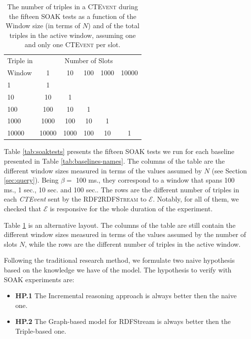 \begin{table}[htb]
	\centering
	\begin{tabular}{l | ccccc} %
	  	\hline
		Triple in & \multicolumn{5}{c}{Number of Slots}  \\
		Window  & 1 & 10 & 100 & 1000&10000\\
		\hline
		1  	 & 1\\
		10   & 10  & 1 \\
		100  & 100 & 10 & 1\\
		1000 & 1000& 100& 10& 1\\
		10000& 10000 & 1000& 100& 10& 1\\
		\hline %
	 \end{tabular}
	\caption{The number of triples in a \textsc{CTEvent} during the fifteen SOAK tests as a function of the Window size (in terms of $N$) and of the total triples in the active window, assuming one and only one \textsc{CTEvent} per slot.}
	\label{tab:soaktests-alt}
\end{table}


Table \ref{tab:soaktests} presents the fifteen SOAK tests we run for each baseline presented in Table \ref{tab:baselines-names}. The columns of the table are the different window sizes measured in terms of the values assumed by $N$ (see Section \ref{sec:query}).  Being $\beta=$ 100 ms., they correspond to a window that spans 100 ms., 1 sec., 10 sec. and 100 sec.. The rows are the different number of triples in each \textit{CTEvent} sent by the \textsc{RDF2RDFStream} to $\mathcal{E}$. Notably, for all of them, we checked that $\mathcal{E}$ is responsive for the whole duration of the experiment. 

Table \ref{tab:soaktests-alt} is an alternative layout. The columns of the table are still contain the different window sizes measured in terms of the values assumed by the number of slots $N$, while the rows are the different number of triples in the active window. 

Following the traditional research method, we formulate two naive hypothesis based on the knowledge we have of the model. The hypothesis to verify with SOAK experiments are:
\begin{itemize}
\item \textbf{HP.1} The Incremental reasoning approach is always better then the naive one.
\item \textbf{HP.2} The Graph-based model for RDFStream is always better then the Triple-based one.
\end{itemize}

